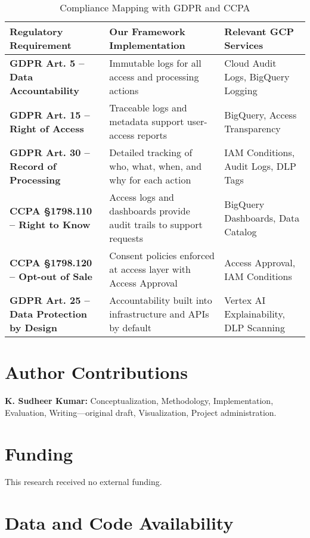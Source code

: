 \documentclass[acmsmall]{acmart}
\begin{document}
\begin{table}[H]
\centering
\caption{Compliance Mapping with GDPR and CCPA}
\label{tab:compliance}
\begin{tabular}{|p{4cm}|p{5.5cm}|p{4.5cm}|}
\hline
\textbf{Regulatory Requirement} & \textbf{Our Framework Implementation} & \textbf{Relevant GCP Services} \\
\hline
\textbf{GDPR Art. 5 – Data Accountability} & Immutable logs for all access and processing actions & Cloud Audit Logs, BigQuery Logging \\
\hline
\textbf{GDPR Art. 15 – Right of Access} & Traceable logs and metadata support user-access reports & BigQuery, Access Transparency \\
\hline
\textbf{GDPR Art. 30 – Record of Processing} & Detailed tracking of who, what, when, and why for each action & IAM Conditions, Audit Logs, DLP Tags \\
\hline
\textbf{CCPA §1798.110 – Right to Know} & Access logs and dashboards provide audit trails to support requests & BigQuery Dashboards, Data Catalog \\
\hline
\textbf{CCPA §1798.120 – Opt-out of Sale} & Consent policies enforced at access layer with Access Approval & Access Approval, IAM Conditions \\
\hline
\textbf{GDPR Art. 25 – Data Protection by Design} & Accountability built into infrastructure and APIs by default & Vertex AI Explainability, DLP Scanning \\
\hline
\end{tabular}
\end{table}






\section*{Author Contributions}

\textbf{K. Sudheer Kumar:} Conceptualization, Methodology, Implementation, Evaluation, Writing—original draft, Visualization, Project administration.

\section*{Funding}

This research received no external funding.

\section*{Data and Code Availability}
\end{document}
